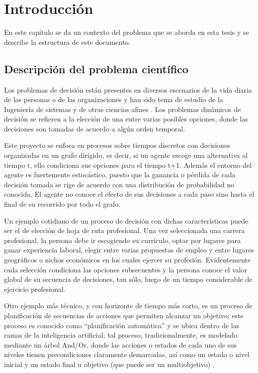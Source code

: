\chapter{Introducción}
En este capítulo se da un contexto del problema que se aborda en esta tesis y se describe la estructura de este documento.

\section{Descripción del problema científico}
Los problemas de decisión están presentes en diversos escenarios de la vida diaria de las personas o de las organizaciones y han sido tema de estudio de la Ingeniería de sistemas y de otras ciencias afines \citep{parnell2011decision}. Los problemas dinámicos de decisión se refieren a la elección de una entre varias posibles opciones, donde las decisiones son tomadas de acuerdo a algún orden temporal. 

Este proyecto se enfoca en procesos sobre tiempos discretos con decisiones organizadas en un grafo dirigido, es decir, si un agente escoge una alternativa al tiempo t, ello condiciona sus opciones para el tiempo t+1. Además el entorno del agente es fuertemente estocástico, puesto que  la ganancia o pérdida de cada decisión tomada se rige de acuerdo con una distribución de probabilidad no conocida. El agente no conoce el efecto de sus decisiones a cada paso sino hasta el final de su recorrido por todo el grafo.

Un ejemplo cotidiano de un proceso de decisión con dichas características puede ser el de elección de hoja de ruta profesional. Una vez seleccionada una carrera profesional, la persona debe ir escogiendo su currículo, optar por lugares para ganar experiencia laboral, elegir entre varias propuestas de empleo y entre lugares geográficos o nichos económicos en los cuales ejercer su profesión. Evidentemente cada selección condiciona las opciones subsecuentes y la persona conoce el valor global de su secuencia de decisiones, tan sólo, luego de un tiempo considerable de ejercicio profesional. 

Otro ejemplo más técnico, y con horizonte de tiempo más corto, es un proceso de planificación de secuencias de acciones que permiten alcanzar un objetivo; este proceso es conocido como ``planificación automática'' y se ubica dentro de las ramas de la inteligencia artificial; tal proceso, tradicionalmente, es modelado mediante un árbol And/Or, donde las acciones o estados de cada uno de sus niveles tienen precondiciones claramente demarcadas, así como un estado o nivel inicial y un estado final u objetivo (que puede ser un multiobjetivo) \citep{russell2004inteligencia}.

